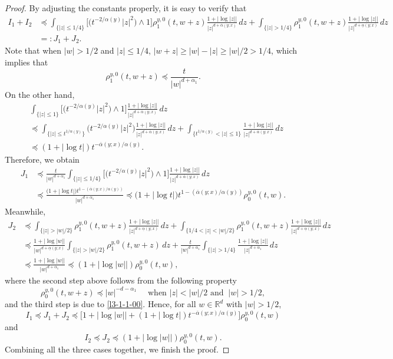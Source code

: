 \documentclass[a4paper,11pt]{amsart}
\renewcommand{\le}{\leqslant}
\renewcommand{\ge}{\geqslant}
\newcommand{\R}{\mathds R}
\newcommand{\p}{\preceq}
\newcommand{\A}{\alpha}
\theoremstyle{definition}
\begin{document}
\begin{proof}
By adjusting the constants properly, it is easy to verify that
\begin{align*}
I_1+I_2&\p \int_{\{|z|\le {1}/{4}\}}\big[\big(t^{-{2}/{\A(y)}}|z|^2\big)\wedge 1\big]
\rho^{y,0}_1(t,w{+} z)\frac{1+|\log|z||}{|z|^{d+\overline{\A}(y;x)}}\,dz +\int_{\{|z|>{1}/{4}\}}\rho^{y,0}_1(t,w{+} z)\frac{1+|\log|z||}{|z|^{d+\underline{\A}(y;x)}}\,dz\\
&=:J_1+J_2.
\end{align*}
Note that when $|w|>{1}/{2}$ and $|z|\le {1}/{4}$,
$|w{+} z|\ge |w|-|z|\ge {|w|}/{2}>{1}/{4}$, which implies
that
$$\rho^{y,0}_1(t,w{+} z)\p \frac{t}{|w|^{d+\A_1}}.$$ On the other hand,
\begin{align*}
&\int_{{\{|z|\le 1\}}}\big[\big(t^{-{2}/{\A(y)}}|z|^2\big)\wedge 1\big]
\frac{1+|\log|z||}{|z|^{d+\overline{\A}(y;x)}}\,dz\\
&\p \int_{{\{|z|\le t^{{1/\A(y)}}\}}}\big(t^{-{2}/{\A(y)}}|z|^2\big)
\frac{1+|\log|z||}{|z|^{d+\overline{\A}(y;x)}}\,dz+\int_{\{t^{{1/\A(y)}}<|z|\le 1\}}\frac{1+|\log|z||}{|z|^{d+\overline{\A}(y;x)}}\,dz\\
&\p (1+|\log t|)t^{-{\overline{\A}(y;x)}/{\A(y)}}.
\end{align*}
Therefore, we obtain
\begin{align*}
J_1&\p \frac{t}{|w|^{d+\A_1}} \int_{{\{|z|\le {1}/{4}\}}}\big[\big(t^{-{2}/{\A(y)}}|z|^2\big)\wedge 1\big]
\frac{1+|\log|z||}{|z|^{d+\overline{\A}(y;x)}}\,dz\\
&\p \frac{\big(1+|\log t|\big)t^{1-({\overline{\A}(y;x)}/{\A(y)})}}{|w|^{d+\A_1}}\p \big(1+|\log t|\big)t^{1-({\overline{\A}(y;x)}/{\A(y)})}\rho^{y,0}_0(t,w).
\end{align*}
Meanwhile,
\begin{align*}
J_2&\p \int_{\{|z|>{|w|}/{2}\}}\!\!\rho^{y,0}_1(t,w{+} z)\frac{1+|\log|z||}{|z|^{d+\underline{\A}(y;x)}}\,dz +\!
\int_{\{{1}/{4}<|z|<{|w|}/{2}\}}\!\!\rho^{y,0}_1(t,w{+} z)\frac{1+|\log|z||}{|z|^{d+\underline{\A}(y;x)}}\,dz\\
&\p
\frac{1+|\log|w||}{|w|^{d+\underline{\A}(y;x)}} \int_{\{|z|>{|w|}/{2}\}}\!\!
\rho^{y,0}_1(t,w{+} z)\,dz +\!
\frac{t}{|w|^{d+\A_1}}\int_{\{|z|>{1}/{4}\}}\!\!\frac{1+|\log|z||}{|z|^{d+\A_1}}\,dz\\
&\p \frac{1+|\log |w||}{|w|^{d+\A_1}}\p (1+|\log |w||)\rho^{y,0}_0(t,w),
\end{align*}
where the second step above follows from  the following property
\begin{equation*}
\rho^{y,0}_0(t,w{+} z)\p |w|^{-d-\A_1}\quad \textrm{ when }
|z|<{|w|}/{2}\textrm{ and }\ |w|>{1}/{2},
\end{equation*}
and the third step is due to \eqref{l3-1-1-00}.
Hence, for all $w\in \R^d$ with $|w|>{1}/{2}$,
$$ I_1\p J_1+J_2\p \big[1+|\log |w||+(1+|\log t|)t^{-{\overline{\A}(y;x)}/{\A(y)}}\big]\rho^{y,0}_0(t,w)$$ and
$$ I_2\p J_2\p  (1+|\log |w||)\rho^{y,0}_0(t,w).
$$
Combining all the three cases together,  we finish the proof.
\end{proof}
\end{document}
